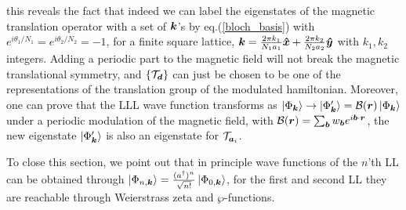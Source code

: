 \documentclass[%
nofootinbib,
 amsmath,amssymb,
 aps,onecolumn,
prb
]{revtex4-2}
\newcommand{\mT}{\mathcal{T}}
\begin{document}
this reveals the fact that indeed we can label the eigenstates of the magnetic translation operator with a set of $\vb*{k}$'s by eq.(\ref{bloch_basis}) with $e^{i\theta_1/N_1}=e^{i\theta_2/N_2}=-1$, for a finite square lattice, $\vb*{k}=\frac{2\pi k_1}{N_1a_1}\vu*{x}+\frac{2\pi k_2}{N_2a_2}\vu*{y}$ with $k_1,k_2$ integers.
Adding a periodic part to the magnetic field will not break the magnetic translational symmetry\cite{dong2022dirac,florek1999magnetic}, and $\{\mT_{\vb*{d}}\}$ can just be chosen to be one of the representations of the translation group of the modulated hamiltonian.
Moreover, one can prove that the LLL wave function transforms as $\ket{\Phi_{\vb*{k}}}\to\ket{\Phi^\prime_{\vb*{k}}}=\mathcal{B}(\vb*{r})\ket{\Phi_{\vb*{k}}}$
under a periodic modulation of the magnetic field, with $\mathcal{B}(\vb*{r})=\sum_{\vb*{b}}w_{\vb*{b}}e^{i\vb*{b}\cdot\vb*{r}}$, the new eigenstate $\ket{\Phi^\prime_{\vb*{k}}}$ is also an eigenstate for $\mT_{\vb*{a}_i}$.  \par 
To close this section, we point out that in principle wave functions of the $n$'th LL can be obtained through $\ket{\Phi_{n,\vb*{k}}}=\frac{(a^\dag)^n}{\sqrt{n!}}\ket{\Phi_{0,\vb*{k}}}$, for the first and second LL they are reachable through Weierstrass zeta and $\wp$-functions. 
\end{document}
